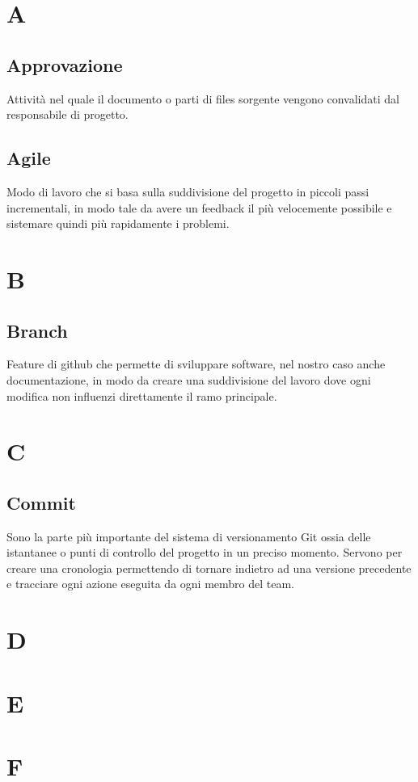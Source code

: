 \section{A}
    \subsection{Approvazione}
    Attività nel quale il documento o parti di files sorgente vengono convalidati dal responsabile di progetto.
    \subsection{Agile}
    Modo di lavoro che si basa sulla suddivisione del progetto in piccoli passi incrementali, in modo 
    tale da avere un feedback il più velocemente possibile e sistemare quindi più rapidamente i problemi.

\section{B}
    \subsection{Branch}
    Feature di github che permette di sviluppare software, nel nostro caso anche documentazione, in modo da creare una suddivisione del lavoro dove ogni modifica non 
    influenzi direttamente il ramo principale.

\section{C}
    \subsection{Commit}
    Sono la parte più importante del sistema di versionamento Git ossia delle istantanee o punti di controllo del progetto in un preciso momento.
    Servono per creare una cronologia permettendo di tornare indietro ad una versione precedente e tracciare ogni azione eseguita da ogni membro del team.

\section{D}
\section{E}
\section{F}
